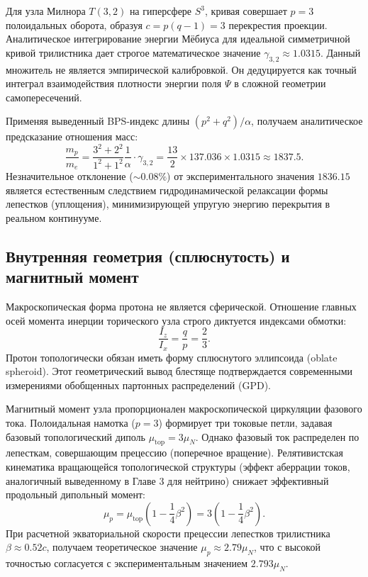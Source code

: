 \documentclass[11pt,a4paper]{article}
\begin{document}
Для узла Милнора $T(3,2)$ на гиперсфере $S^3$, кривая совершает $p=3$ полоидальных оборота, образуя $c = p(q-1) = 3$ перекрестия проекции. Аналитическое интегрирование энергии Мёбиуса для идеальной симметричной кривой трилистника дает строгое математическое значение $\gamma_{3,2} \approx 1.0315$. 
Данный множитель не является эмпирической калибровкой. Он дедуцируется как точный интеграл взаимодействия плотности энергии поля $\Psi$ в сложной геометрии самопересечений.

Применяя выведенный BPS-индекс длины $(p^2+q^2)/\alpha$, получаем аналитическое предсказание отношения масс:
\begin{equation}
\frac{m_p}{m_e} = \frac{3^2 + 2^2}{1^2 + 1^2} \frac{1}{\alpha} \cdot \gamma_{3,2} = \frac{13}{2} \times 137.036 \times 1.0315 \approx 1837.5.
\end{equation}
Незначительное отклонение ($\sim 0.08\%$) от экспериментального значения $1836.15$ является естественным следствием гидродинамической релаксации формы лепестков (уплощения), минимизирующей упругую энергию перекрытия в реальном континууме.

\subsection{Внутренняя геометрия (сплюснутость) и магнитный момент}
Макроскопическая форма протона не является сферической. Отношение главных осей момента инерции торического узла строго диктуется индексами обмотки:
\begin{equation}
\frac{I_z}{I_x} = \frac{q}{p} = \frac{2}{3}.
\end{equation}
Протон топологически обязан иметь форму сплюснутого эллипсоида (oblate spheroid). Этот геометрический вывод блестяще подтверждается современными измерениями обобщенных партонных распределений (GPD).

Магнитный момент узла пропорционален макроскопической циркуляции фазового тока. Полоидальная намотка ($p=3$) формирует три токовые петли, задавая базовый топологический диполь $\mu_{\text{top}} = 3 \mu_N$.
Однако фазовый ток распределен по лепесткам, совершающим прецессию (поперечное вращение). Релятивистская кинематика вращающейся топологической структуры (эффект аберрации токов, аналогичный выведенному в Главе 3 для нейтрино) снижает эффективный продольный дипольный момент:
\begin{equation}
\mu_p = \mu_{\text{top}} \left(1 - \frac{1}{4}\beta^2\right) = 3 \left(1 - \frac{1}{4}\beta^2\right).
\end{equation}
При расчетной экваториальной скорости прецессии лепестков трилистника $\beta \approx 0.52 c$, получаем теоретическое значение $\mu_p \approx 2.79 \mu_N$, что с высокой точностью согласуется с экспериментальным значением $2.793 \mu_N$.
\end{document}

